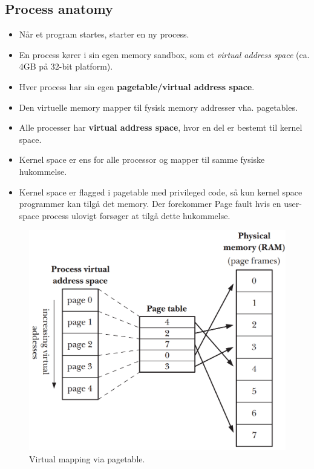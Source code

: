 \subsection{Process anatomy}
\begin{itemize}
	\item Når et program startes, starter en ny process.
	\item En process kører i sin egen memory sandbox, som et \textit{virtual address space} (ca. 4GB på 32-bit platform).
	\item Hver process har sin egen \textbf{pagetable/virtual address space}.
	\item Den virtuelle memory mapper til fysisk memory addresser vha. pagetables.
	\item Alle processer har \textbf{virtual address space}, hvor en del er bestemt til kernel space.
	\item Kernel space er ens for alle processor og mapper til samme fysiske hukommelse.
	\item Kernel space er flagged i pagetable med privileged code, så kun kernel space programmer kan tilgå det memory. Der forekommer Page fault hvis en user-space process ulovigt forsøger at tilgå dette hukommelse.
\end{itemize}

\begin{figure}[h]
	\centering
	\includegraphics[width=0.7\linewidth]{figs/spm1/pagetable}
	\caption{Virtual mapping via pagetable.}
	\label{fig:pagetable}
\end{figure}

